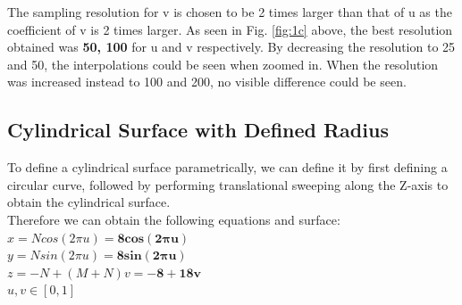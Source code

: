 \documentclass[acmlarge,nonacm=true]{acmart}
\begin{document}
The sampling resolution for v is chosen to be 2 times larger than that of u as the coefficient of v is 
2 times larger. As seen in Fig. \ref{fig:1c} above, the best resolution obtained was \textbf{50, 100} for u and v respectively.
By decreasing the resolution to 25 and 50, the interpolations could be seen when zoomed in. When the resolution was increased
instead to 100 and 200, no visible difference could be seen.

\subsection{Cylindrical Surface with Defined Radius}
To define a cylindrical surface parametrically, we can define it by first 
defining a circular curve, followed by performing translational sweeping along the
Z-axis to obtain the cylindrical surface.\\
Therefore we can obtain the following equations and surface:\\
\(x = Ncos(2\pi u) = \mathbf{8cos(2\pi u)}\)\\
\(y = Nsin(2\pi u) = \mathbf{8sin(2\pi u)}\)\\
\(z = -N + (M+N)v = \mathbf{-8 + 18v}\)\\
\(u,v \in [0,1]\)
\end{document}
